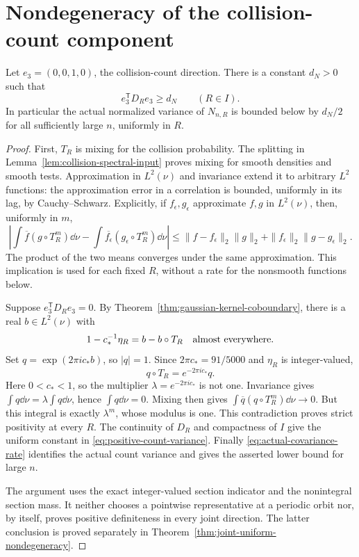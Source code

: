 \section{Nondegeneracy of the collision-count component}
\label{sec:count-nondegeneracy}
\begin{corollary}
\label{cor:positive-count-variance}
Let $e_3=(0,0,1,0)$, the collision-count direction. There is a constant
$d_N>0$ such that
\begin{equation}\label{eq:positive-count-variance}
 e_3^{\mathsf T}D_Re_3\ge d_N\qquad(R\in I).
\end{equation}
In particular the actual normalized variance of $N_{n,R}$ is bounded
below by $d_N/2$ for all sufficiently large $n$, uniformly in $R$.
\end{corollary}
\begin{proof}
First, $T_R$ is mixing for the collision probability. The splitting in
Lemma~\ref{lem:collision-spectral-input} proves mixing for smooth
densities and smooth tests. Approximation in $L^2(\nu)$ and invariance
extend it to arbitrary $L^2$ functions: the approximation error in a
correlation is bounded, uniformly in its lag, by Cauchy--Schwarz.
Explicitly, if $f_\epsilon,g_\epsilon$ approximate $f,g$ in $L^2(\nu)$,
then, uniformly in $m$,
\[
 \left|\int\overline f(g\circ T_R^m)\dd\nu
       -\int\overline{f_\epsilon}(g_\epsilon\circ T_R^m)\dd\nu\right|
 \le\|f-f_\epsilon\|_2\|g\|_2
      +\|f_\epsilon\|_2\|g-g_\epsilon\|_2.
\]
The product of the two means converges under the same approximation.
This implication is used for each fixed $R$, without a rate for the
nonsmooth functions below.

Suppose $e_3^{\mathsf T}D_Re_3=0$. By
Theorem~\ref{thm:gaussian-kernel-coboundary}, there is a real
$b\in L^2(\nu)$ with
\[
 1-c_*^{-1}\eta_R=b-b\circ T_R
 \quad\hbox{almost everywhere}.
\]
Set $q=\exp(2\pi i c_*b)$, so $|q|=1$. Since
$2\pi c_*=91/5000$ and $\eta_R$ is integer-valued,
\[
 q\circ T_R=e^{-2\pi i c_*}q.
\]
Here $0<c_*<1$, so the multiplier $\lambda=e^{-2\pi i c_*}$ is
not one. Invariance gives $\int q\dd\nu=\lambda\int q\dd\nu$,
hence $\int q\dd\nu=0$. Mixing then gives
$\int\overline q(q\circ T_R^m)\dd\nu\to0$. But this integral is
exactly $\lambda^m$, whose modulus is one. This contradiction proves
strict positivity at every $R$. The continuity of $D_R$ and compactness
of $I$ give the uniform constant in \eqref{eq:positive-count-variance}.
Finally \eqref{eq:actual-covariance-rate} identifies the actual count
variance and gives the asserted lower bound for large $n$.

The argument uses the exact integer-valued section indicator and the
nonintegral section mass. It neither chooses a pointwise representative
at a periodic orbit nor, by itself, proves positive definiteness in
every joint direction. The latter conclusion is proved separately in
Theorem~\ref{thm:joint-uniform-nondegeneracy}.
\end{proof}

